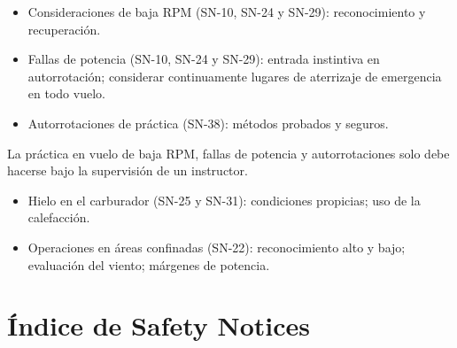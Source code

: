 \begin{itemize}
\item Consideraciones de baja RPM (SN-10, SN-24 y SN-29): reconocimiento y recuperación.
\item Fallas de potencia (SN-10, SN-24 y SN-29): entrada instintiva en autorrotación; considerar continuamente lugares de aterrizaje de emergencia en todo vuelo.
\item Autorrotaciones de práctica (SN-38): métodos probados y seguros.
\end{itemize}

\begin{precaucion}
La práctica en vuelo de baja RPM, fallas de potencia y autorrotaciones solo debe hacerse bajo la supervisión de un instructor.
\end{precaucion}

\begin{itemize}
\item Hielo en el carburador (SN-25 y SN-31): condiciones propicias; uso de la calefacción.
\item Operaciones en áreas confinadas (SN-22): reconocimiento alto y bajo; evaluación del viento; márgenes de potencia.
\end{itemize}

\section{Índice de Safety Notices}

